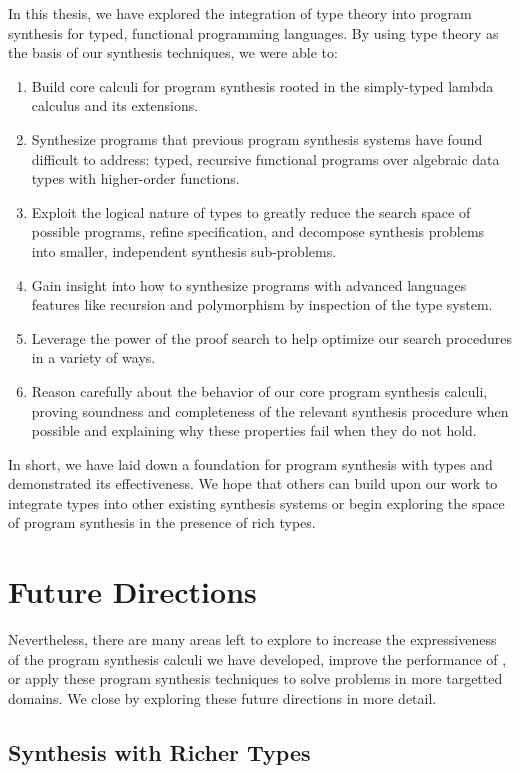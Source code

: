 In this thesis, we have explored the integration of type theory into program synthesis for typed, functional programming languages.
By using type theory as the basis of our synthesis techniques, we were able to:
\begin{enumerate}
  \item Build core calculi for program synthesis rooted in the simply-typed lambda calculus and its extensions.
  \item Synthesize programs that previous program synthesis systems have found difficult to address: typed, recursive functional programs over algebraic data types with higher-order functions.
  \item Exploit the logical nature of types to greatly reduce the search space of possible programs, refine specification, and decompose synthesis problems into smaller, independent synthesis sub-problems.
  \item Gain insight into how to synthesize programs with advanced languages features like recursion and polymorphism by inspection of the type system.
  \item Leverage the power of the proof search to help optimize our search procedures in a variety of ways.
  \item Reason carefully about the behavior of our core program synthesis calculi, proving soundness and completeness of the relevant synthesis procedure when possible and explaining why these properties fail when they do not hold.
\end{enumerate}
In short, we have laid down a foundation for program synthesis with types and demonstrated its effectiveness.
We hope that others can build upon our work to integrate types into other existing synthesis systems or begin exploring the space of program synthesis in the presence of rich types.

\section{Future Directions}
\label{sec:future-directions}

Nevertheless, there are many areas left to explore to increase the expressiveness of the program synthesis calculi we have developed, improve the performance of \myth{}, or apply these program synthesis techniques to solve problems in more targetted domains.
We close by exploring these future directions in more detail.

\subsection{Synthesis with Richer Types}
\label{subsec:synthesis-with-richer-types}

